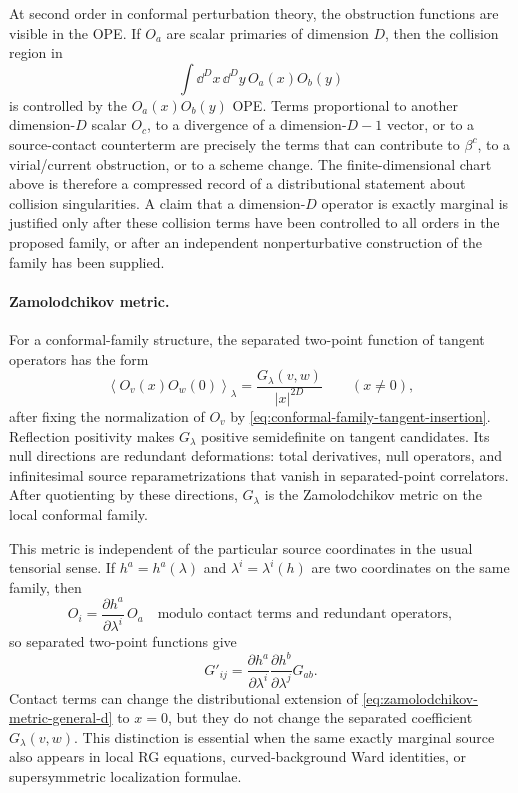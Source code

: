 At second order in conformal perturbation theory, the obstruction functions
are visible in the OPE.  If \(O_a\) are scalar primaries of dimension \(D\),
then the collision region in
\[
  \int \dd^D x\,\dd^D y\,
  O_a(x)O_b(y)
\]
is controlled by the \(O_a(x)O_b(y)\) OPE.  Terms proportional to another
dimension-\(D\) scalar \(O_c\), to a divergence of a dimension-\(D-1\) vector,
or to a source-contact counterterm are precisely the terms that can contribute
to \(\beta^c\), to a virial/current obstruction, or to a scheme change.  The
finite-dimensional chart above is therefore a compressed record of a
distributional statement about collision singularities.  A claim that a
dimension-\(D\) operator is exactly marginal is justified only after these
collision terms have been controlled to all orders in the proposed family, or
after an independent nonperturbative construction of the family has been
supplied.

\paragraph{Zamolodchikov metric.}
For a conformal-family structure, the separated two-point function of tangent
operators has the form
\begin{equation}
  \left\langle O_v(x)O_w(0)\right\rangle_\lambda
  =
  \frac{G_\lambda(v,w)}{|x|^{2D}}
  \qquad (x\ne0),
  \label{eq:zamolodchikov-metric-general-d}
\end{equation}
after fixing the normalization of \(O_v\) by
\eqref{eq:conformal-family-tangent-insertion}.  Reflection positivity makes
\(G_\lambda\) positive semidefinite on tangent candidates.  Its null
directions are redundant deformations: total derivatives, null operators, and
infinitesimal source reparametrizations that vanish in separated-point
correlators.  After quotienting by these directions, \(G_\lambda\) is the
Zamolodchikov metric on the local conformal family.

This metric is independent of the particular source coordinates in the usual
tensorial sense.  If \(h^a=h^a(\lambda)\) and
\(\lambda^i=\lambda^i(h)\) are two coordinates on the same family, then
\[
  O_i=\frac{\partial h^a}{\partial\lambda^i}\,O_a
  \quad
  \text{modulo contact terms and redundant operators},
\]
so separated two-point functions give
\begin{equation}
  G'_{ij}
  =
  \frac{\partial h^a}{\partial\lambda^i}
  \frac{\partial h^b}{\partial\lambda^j}
  G_{ab}.
  \label{eq:zamolodchikov-metric-coordinate-transform}
\end{equation}
Contact terms can change the distributional extension of
\eqref{eq:zamolodchikov-metric-general-d} to \(x=0\), but they do not change
the separated coefficient \(G_\lambda(v,w)\).  This distinction is essential
when the same exactly marginal source also appears in local RG equations,
curved-background Ward identities, or supersymmetric localization formulae.

